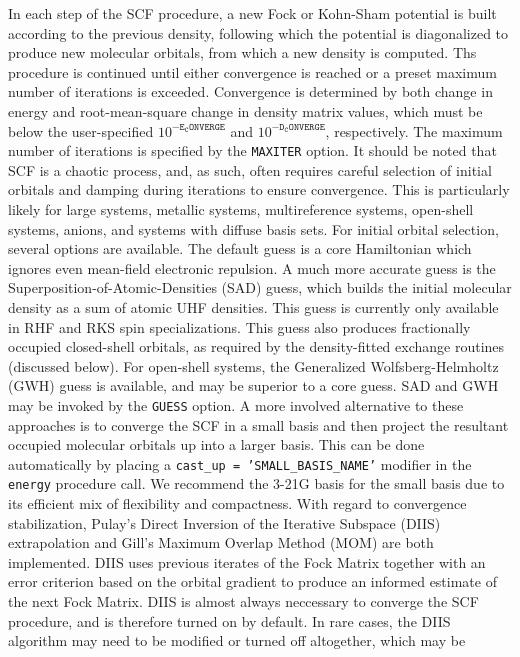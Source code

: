 In each step of the SCF procedure, a new Fock or Kohn-Sham potential is built
according to the previous density, following which the potential is diagonalized
to produce new molecular orbitals, from which a new density is computed. Ths
procedure is continued until either convergence is reached or a preset maximum
number of iterations is exceeded. Convergence is determined by both change in
energy and root-mean-square change in density matrix values, which must be below
the user-specified $10^{\mathtt{-E_CONVERGE}}$ and $10^{-\mathtt{D_CONVERGE}}$,
respectively. The maximum number of iterations is specified by the
\texttt{MAXITER} option. It should be noted that SCF is a chaotic process, and,
as such, often requires careful selection of initial orbitals and damping during
iterations to ensure convergence. This is particularly likely for large systems,
metallic systems, multireference systems, open-shell systems, anions, and
systems with diffuse basis sets. For initial orbital selection, several options
are available. The default guess is a core Hamiltonian which ignores even
mean-field electronic repulsion. A much more accurate guess is the
Superposition-of-Atomic-Densities (SAD) guess, which builds the initial
molecular density as a sum of atomic UHF densities. This guess is currently only
available in RHF and RKS spin specializations. This guess also produces
fractionally occupied closed-shell orbitals, as required by the density-fitted
exchange routines (discussed below). For open-shell systems, the Generalized
Wolfsberg-Helmholtz (GWH) guess is available, and may be superior to a core
guess. SAD and GWH may be invoked by the \texttt{GUESS} option. A more involved
alternative to these approaches is to converge the SCF in a small basis and then
project the resultant occupied molecular orbitals up into a larger basis. This
can be done automatically by placing a \texttt{cast_up = 'SMALL_BASIS_NAME'}
modifier in the \texttt{energy} procedure call. We recommend the 3-21G basis for
the small basis due to its efficient mix of flexibility and compactness. With
regard to convergence stabilization, Pulay's Direct Inversion of the Iterative
Subspace (DIIS) extrapolation and Gill's Maximum Overlap Method (MOM) are both
implemented. DIIS uses previous iterates of the Fock Matrix together with an
error criterion based on the orbital gradient to produce an informed estimate of
the next Fock Matrix. DIIS is almost always neccessary to converge the SCF
procedure, and is therefore turned on by default. In rare cases, the DIIS
algorithm may need to be modified or turned off altogether, which may be

